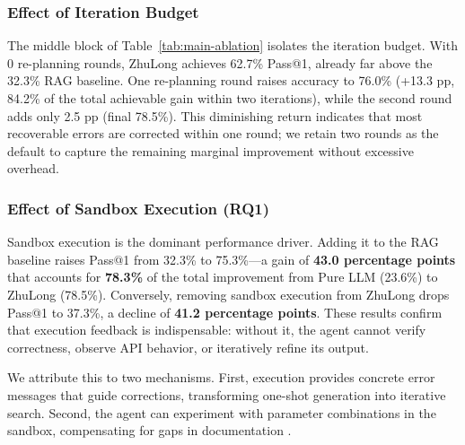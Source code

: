 \subsubsection{Effect of Iteration Budget}
\label{sec:iteration-budget-effect}

The middle block of Table~\ref{tab:main-ablation} isolates the iteration budget.
With 0 re-planning rounds, ZhuLong achieves 62.7\% Pass@1, already far above 
the 32.3\% RAG baseline.
One re-planning round raises accuracy to 76.0\% (+13.3 pp, 84.2\% of the total 
achievable gain within two iterations), while the second round adds only 
2.5 pp (final 78.5\%).
This diminishing return indicates that most recoverable errors are corrected 
within one round; we retain two rounds as the default to capture the remaining 
marginal improvement without excessive overhead.

\subsubsection{Effect of Sandbox Execution (RQ1)}

Sandbox execution is the dominant performance driver. Adding it to the RAG baseline raises Pass@1 from 32.3\% to 75.3\%---a gain of \textbf{43.0 percentage points} that accounts for \textbf{78.3\%} of the total improvement from Pure LLM (23.6\%) to ZhuLong (78.5\%). Conversely, removing sandbox execution from ZhuLong drops Pass@1 to 37.3\%, a decline of \textbf{41.2 percentage points}. These results confirm that execution feedback is indispensable: without it, the agent cannot verify correctness, observe API behavior, or iteratively refine its output.

We attribute this to two mechanisms. First, execution provides concrete error messages that guide corrections, transforming one-shot generation into iterative search. Second, the agent can experiment with parameter combinations in the sandbox, compensating for gaps in documentation \cite{kumar2026agentforge, jiang2024seed}.

